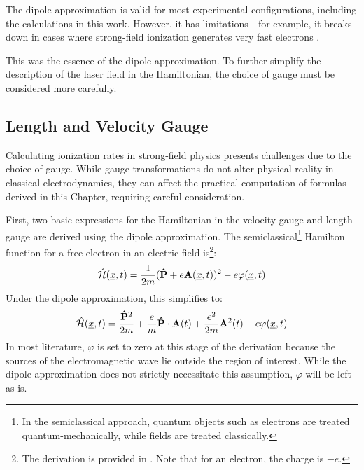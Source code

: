 The dipole approximation is valid for most experimental configurations, including the calculations in this work. 
However, it has limitations—for example, it breaks down in cases where strong-field ionization generates very fast electrons \cite{bosmandipoleapprox, breakdowndipoleapprox}.

This was the essence of the dipole approximation.
To further simplify the description of the laser field in the Hamiltonian, the choice of gauge must be considered more carefully.






\subsection{Length and Velocity Gauge}
Calculating ionization rates in strong-field physics presents challenges due to the choice of gauge. While gauge transformations do not alter physical reality in classical electrodynamics, they can affect the practical computation of formulas derived in this Chapter, requiring careful consideration.

First, two basic expressions for the Hamiltonian in the velocity gauge and length gauge are derived using the dipole approximation.
The semiclassical\footnote{In the semiclassical approach, quantum objects such as electrons are treated quantum-mechanically, while fields are treated classically.} Hamilton function for a free electron in an electric field is\footnote{The derivation is provided in \cite{LandauLifschitzBand2}. Note that for an electron, the charge is $-e$.}:%
\begin{equation}%
    \hat{\Hs}(\uvec{x}, t) = \frac{1}{2m}(\vec{\hat{P}} + e \vec{A}(\uvec{x}, t))^2 - e \varphi(\uvec{x}, t) \label{eq:semiClassicalHamilton}
\end{equation}
Under the dipole approximation, this simplifies to:
\begin{equation*}
    \hat{\mathcal{H}}(\underline{x}, t) = \frac{\mathbf{\hat{P}}^2}{2m} + \frac{e}{m}\mathbf{\hat{P}}\cdot \mathbf{A}(t) + \frac{e^2}{2m}\mathbf{A}^2(t) - e \varphi(\underline{x}, t)
\end{equation*}
In most literature, $\varphi$ is set to zero at this stage of the derivation because the sources of the electromagnetic wave lie outside the region of interest.
While the dipole approximation does not strictly necessitate this assumption, $\varphi$ will be left as is.

